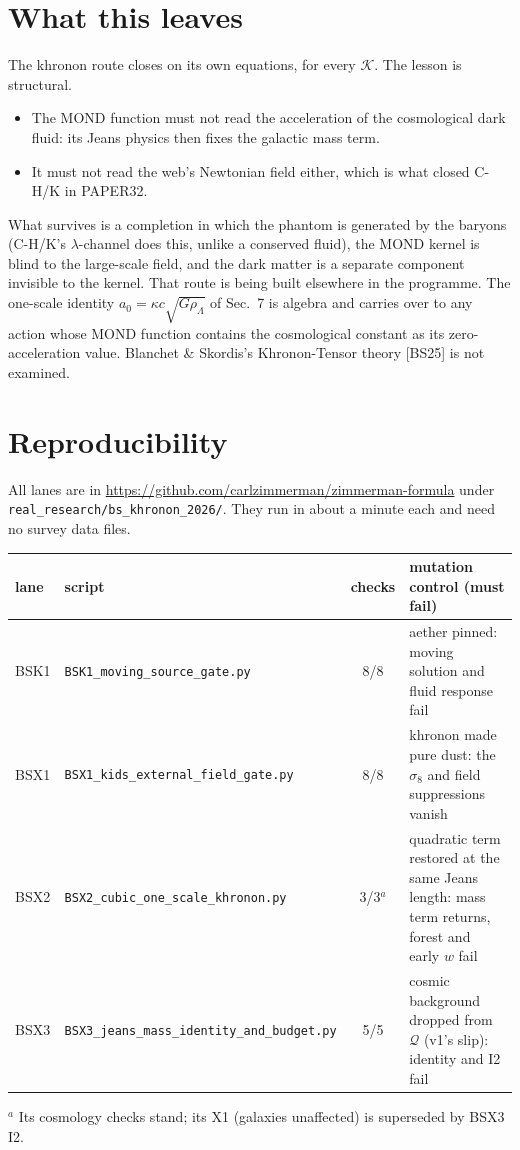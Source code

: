 \documentclass[10pt]{article}
\newcommand{\fpath}[1]{\nolinkurl{#1}}
\begin{document}
\section{What this leaves}
The khronon route closes on its own equations, for every $\mathcal K$. The lesson is structural.
\begin{itemize}
\item The MOND function must not read the acceleration of the cosmological dark fluid: its Jeans physics then fixes the galactic mass term.
\item It must not read the web's Newtonian field either, which is what closed C-H/K in PAPER32.
\end{itemize}
What survives is a completion in which the phantom is generated by the baryons (C-H/K's $\lambda$-channel does this, unlike a conserved fluid), the MOND kernel is blind to the large-scale field, and the dark matter is a separate component invisible to the kernel. That route is being built elsewhere in the programme.
The one-scale identity $a_0=\kappa c\sqrt{G\rho_\Lambda}$ of Sec.~7 is algebra and carries over to any action whose MOND function contains the cosmological constant as its zero-acceleration value.
Blanchet \& Skordis's Khronon-Tensor theory [BS25] is not examined.

\section{Reproducibility}
All lanes are in \url{https://github.com/carlzimmerman/zimmerman-formula} under \fpath{real_research/bs_khronon_2026/}. They run in about a minute each and need no survey data files.

\smallskip
{\footnotesize
\begin{longtable}{@{}l>{\raggedright\arraybackslash}p{}c>{\raggedright\arraybackslash}p{}@{}}
\toprule
lane & script & checks & mutation control (must fail)\\
\midrule
\endhead
BSK1 & \fpath{BSK1_moving_source_gate.py} & 8/8 & aether pinned: moving solution and fluid response fail\\
BSX1 & \fpath{BSX1_kids_external_field_gate.py} & 8/8 & khronon made pure dust: the $\sigma_8$ and field suppressions vanish\\
BSX2 & \fpath{BSX2_cubic_one_scale_khronon.py} & 3/3$^a$ & quadratic term restored at the same Jeans length: mass term returns, forest and early $w$ fail\\
BSX3 & \fpath{BSX3_jeans_mass_identity_and_budget.py} & 5/5 & cosmic background dropped from $\mathcal Q$ (v1's slip): identity and I2 fail\\
\bottomrule
\end{longtable}
$^a$ Its cosmology checks stand; its X1 (galaxies unaffected) is superseded by BSX3 I2.
}
\end{document}
